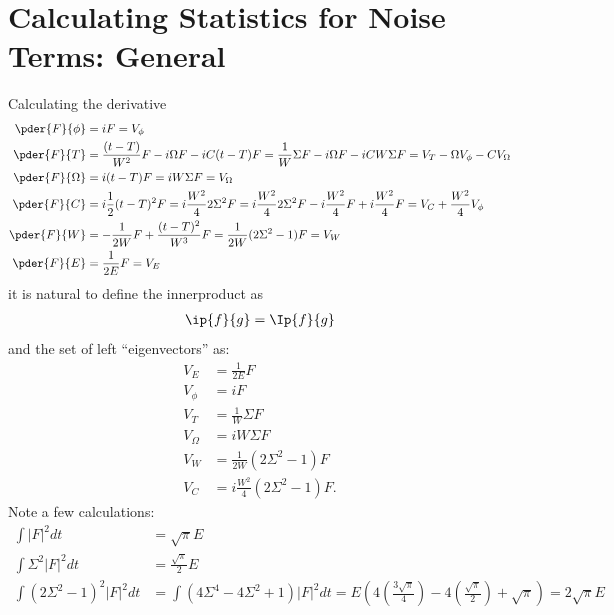 
\section{Calculating Statistics for Noise Terms: General}
Calculating the derivative
\begin{equation}
\begin{split}
\pder{F}{\phi} &= iF = V_\phi\\
\pder{F}{T} &= \frac{(t-T)}{W^2}F - i \Omega F - i C (t-T) F =  \frac{1}{W}\Sigma F - i \Omega F - i CW \Sigma F =  V_T - \Omega V_{\phi} - C V_{\Omega}\\
\pder{F}{\Omega} &= i(t-T) F = iW\Sigma F = V_{\Omega}\\
\pder{F}{C} &= i\frac{1}{2} (t-T)^2 F = i\frac{W^2}{4}2\Sigma^2 F = i\frac{W^2}{4}2\Sigma^2 F - i\frac{W^2}{4}F + i\frac{W^2}{4}F =  V_{C} + \frac{W^2}{4}V_{\phi} \\
\pder{F}{W} &= -\frac{1}{2W}F + \frac{(t-T)^2}{W^3}F = \frac{1}{2W}(2\Sigma^2-1)F = V_W\\
\pder{F}{E} &= \frac{1}{2E} F =  V_E
\end{split}
\end{equation}
it is natural to define the innerproduct as
\begin{equation}
\begin{split}
\ip{f}{g} = \Ip{f}{g} 
\end{split}
\end{equation}
and the set of left ``eigenvectors'' as:
\begin{equation}
\begin{split}
V_E &= \frac{1}{2E} F\\
V_{\phi} &= iF\\
V_{T} &= \frac{1}{W} \Sigma F\\
V_{\Omega} &= iW\Sigma F\\
V_W &= \frac{1}{2W}(2\Sigma^2-1)F\\
V_C &= i \frac{W^2}{4}(2\Sigma^2-1)F.
\end{split}
\end{equation}
Note a few calculations:
\begin{equation}
\begin{split}
\int |F|^2 dt &= \sqrt{\pi} E\\
\int \Sigma^2 |F|^2 dt &= \frac{\sqrt{\pi}}{2} E\\
\int (2\Sigma^2-1)^2 |F|^2dt &=  \int \left(4\Sigma^4 - 4\Sigma^2  +1\right) |F|^2dt =  E \left(4 \left(\frac{3\sqrt{\pi}}{4}\right) - 4\left(\frac{\sqrt{\pi}}{2}\right) + \sqrt{\pi}\right) = 2\sqrt{\pi}E\\
\end{split}
\end{equation}

